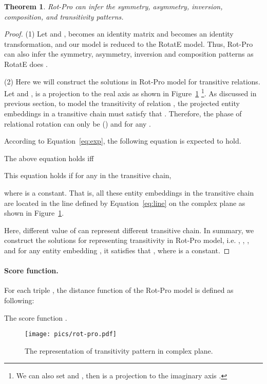 \documentclass{article}
\newtheorem{theorem}{Theorem}
\begin{document}
\begin{theorem}
\label{theorem}
Rot-Pro can infer the symmetry, asymmetry, inversion, composition, and transitivity patterns.
\end{theorem}
\begin{proof}
(1) Let  and ,  becomes an identity matrix and  becomes an identity transformation, and our model is reduced to the RotatE model. Thus, Rot-Pro can also infer the symmetry, asymmetry, inversion and composition patterns as RotatE does \cite{rotate}.

(2) Here we will construct the solutions in Rot-Pro model for transitive relations. Let  and ,  is a projection to the real axis  as shown in Figure~\ref{fig:proj-rot} \footnote{We can also set  and , then  is a projection to the imaginary axis .}. As discussed in previous section, to model the transitivity of relation , the projected entity embeddings in a transitive chain must satisfy that . Therefore, the phase of relational rotation  can only be  () and   for any .

According to Equation~\ref{eq:exp}, the following equation is expected to hold.


The above equation holds iff

This equation holds if for any  in the transitive chain,

where  is a constant. That is, all these entity embeddings  in the transitive chain are located in the line defined by Equation~\eqref{eq:line} on the complex plane as shown in Figure~\ref{fig:proj-rot}.

Here, different value of  can represent different transitive chain.
In summary, we construct the solutions for representing transitivity in Rot-Pro model, i.e. , , , and for any entity embedding , it satisfies that , where  is a constant.
\end{proof}

\paragraph{Score function.} For each triple , the distance function of the Rot-Pro model is defined as following:

The score function .

\begin{figure}
\centering
\texttt{[image: pics/rot-pro.pdf]}
\caption{The representation of transitivity pattern in complex plane.}
\label{fig:proj-rot}
\end{figure}
\end{document}
